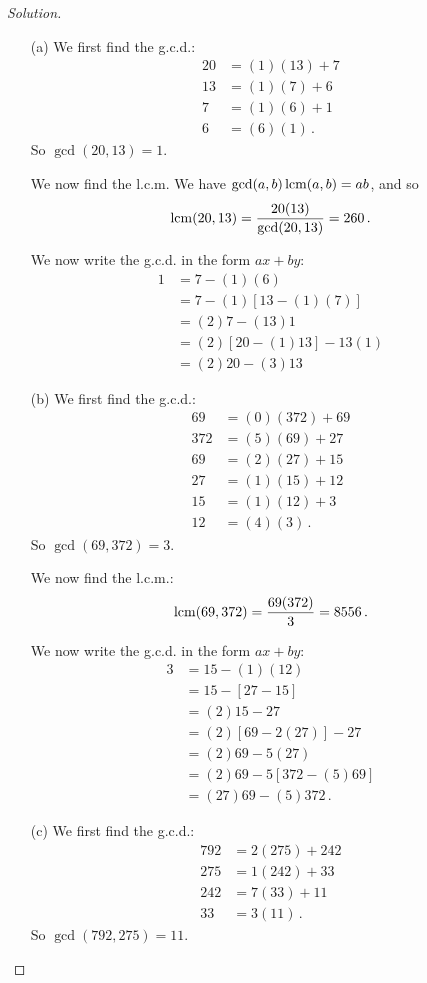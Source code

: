 \begin{proof}[Solution]
	\begin{enumerate}
		\item[(a)] We first find the g.c.d.:
			\begin{align*}
				20 &= (1)(13) + 7 \\
				13 &= (1)(7) + 6 \\
				7 &= (1)(6) + 1 \\
				6 &= (6)(1)\,.
			\end{align*}
			So $\gcd(20,13) = 1$.
			
			We now find the l.c.m. We have $\gcd(a,b)\operatorname{lcm}(a,b) = ab$, and so
			\[
				\operatorname{lcm}(20,13) = \frac{20(13)}{\gcd(20,13)} = 260\,.
			\]
			
			We now write the g.c.d. in the form $ax + by$:
			\begin{align*}
				1 &= 7 - (1)(6) \\
					&= 7 - (1)[13 - (1)(7)] \\
					&= (2)7 - (13)1 \\
					&= (2)[20 - (1)13] - 13(1) \\
					&= (2)20 - (3)13
			\end{align*}
		\item[(b)] We first find the g.c.d.:
			\begin{align*}
				69 &= (0)(372) + 69 \\
				372 &= (5)(69) + 27 \\
				69 &= (2)(27) + 15 \\
				27 &= (1)(15) + 12 \\
				15 &= (1)(12) + 3 \\
				12 &= (4)(3)\,.
			\end{align*}
			So $\gcd(69,372) = 3$.
			
			We now find the l.c.m.:
			\[
				\operatorname{lcm}(69,372) = \frac{69(372)}{3} = 8556\,.
			\]
			
			We now write the g.c.d. in the form $ax + by$:
			\begin{align*}
				3 &= 15 - (1)(12) \\
					&= 15 - [27 - 15] \\
					&= (2)15 - 27 \\
					&= (2)[69 - 2(27)] - 27 \\
					&= (2)69 - 5(27) \\
					&= (2)69 - 5[372 - (5)69] \\
					&= (27)69 - (5)372\,.
			\end{align*}
		\item[(c)] We first find the g.c.d.:
			\begin{align*}
				792 &= 2(275) + 242 \\
				275 &= 1(242) + 33 \\
				242 &= 7(33) + 11 \\
				33 &= 3(11)\,.
			\end{align*}
			So $\gcd(792,275) = 11$.
			

\end{enumerate}
\end{proof}
